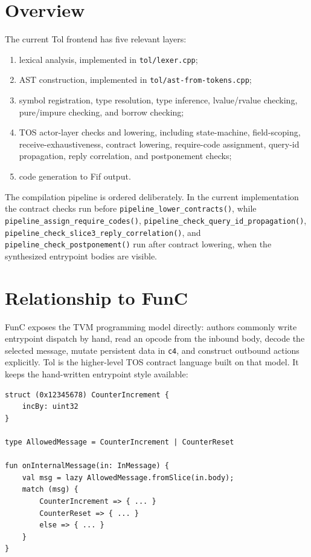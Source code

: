 \documentclass[12pt,oneside]{article}
\begin{document}
\clearpage
\tableofcontents

\clearpage
\section{Overview}
The current Tol frontend has five relevant layers:

\begin{enumerate}
\item lexical analysis, implemented in \verb|tol/lexer.cpp|;
\item AST construction, implemented in \verb|tol/ast-from-tokens.cpp|;
\item symbol registration, type resolution, type inference, lvalue/rvalue
checking, pure/impure checking, and borrow checking;
\item TOS actor-layer checks and lowering, including state-machine,
field-scoping, receive-exhaustiveness, contract lowering, require-code
assignment, query-id propagation, reply correlation, and postponement checks;
\item code generation to Fif output.
\end{enumerate}

The compilation pipeline is ordered deliberately. In the current implementation
the contract checks run before \verb|pipeline_lower_contracts()|, while
\verb|pipeline_assign_require_codes()|,
\verb|pipeline_check_query_id_propagation()|,
\verb|pipeline_check_slice3_reply_correlation()|, and
\verb|pipeline_check_postponement()| run after contract lowering, when the
synthesized entrypoint bodies are visible.

\section{Relationship to FunC}
FunC exposes the TVM programming model directly: authors commonly write
entrypoint dispatch by hand, read an opcode from the inbound body, decode the
selected message, mutate persistent data in \verb|c4|, and construct outbound
actions explicitly. Tol is the higher-level TOS contract language built on that
model. It keeps the hand-written entrypoint style available:

\begin{verbatim}
struct (0x12345678) CounterIncrement {
    incBy: uint32
}

type AllowedMessage = CounterIncrement | CounterReset

fun onInternalMessage(in: InMessage) {
    val msg = lazy AllowedMessage.fromSlice(in.body);
    match (msg) {
        CounterIncrement => { ... }
        CounterReset => { ... }
        else => { ... }
    }
}
\end{verbatim}
\end{document}
